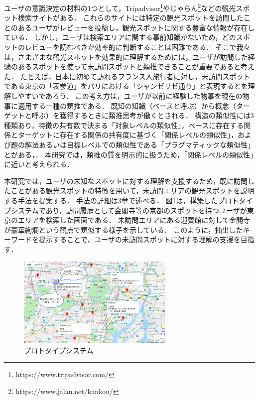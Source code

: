 \documentclass[submit]{ipsj}
\begin{document}
ユーザの意識決定の材料の1つとして，Tripadvisor\footnote{https://www.tripadvisor.com/}やじゃらん\footnote{https://www.jalan.net/kankou/}などの観光スポット検索サイトがある．
これらのサイトには特定の観光スポットを訪問したことのあるユーザがレビューを投稿し，観光スポットに関する豊富な情報が存在している．
しかし，ユーザは検索エリアに関する事前知識がないため，どのスポットのレビューを読むべきか効率的に判断することは困難である．
そこで我々は，さまざまな観光スポットを効果的に理解するためには，ユーザが訪問した経験のあるスポットを使って未訪問スポットと類推できることが重要であると考えた．
たとえば，日本に初めて訪れるフランス人旅行者に対し，未訪問スポットである東京の「表参道」をパリにおける「シャンゼリゼ通り」と表現するとを理解しやすいであろう．
この考え方は，ユーザが以前に経験した物事を現在の物事に適用する一種の類推である．
既知の知識（ベースと呼ぶ）から概念（ターゲットと呼ぶ）を獲得するときに類推思考が働くとされる\cite{GENTNER1983155}．
構造の類似性には3種類あり，特徴の共有数で決まる「対象レベルの類似性」，ベースに存在する関係とターゲットに存在する関係の共有度に基づく「関係レベルの類似性」，および題の解法あるいは目標レベルでの類似性である「プラグマティックな類似性」とがある\cite{GENTNER1983155}，\cite{Holyoak}．
本研究では，類推の質を明示的に扱うため，「関係レベルの類似性」に近いと考えられる．

本研究では，ユーザの未知なスポットに対する理解を支援するため，既に訪問したことがある観光スポットの特徴を用いて，未訪問エリアの観光スポットを説明する手法を提案する．
手法の詳細は3章で述べる．
図\ref{fig:Photo_Map}は，構築したプロトタイプシステムであり，訪問履歴として金閣寺等の京都のスポットを持つユーザが東京のエリアを検索した画面である．
未訪問エリアにある迎賓館に対して金閣寺が豪華絢爛という観点で類似する様子を示している．
このように，抽出したキーワードを提示することで，ユーザの未訪問スポットに対する理解の支援を目指す．

\begin{figure}[t]
  \begin{center}
    \includegraphics[clip,width=7.5cm]{picture/Photo_Map2_jap.png}
    \caption{プロトタイプシステム}
    \label{fig:Photo_Map}
   \end{center}
\end{figure}
\end{document}
